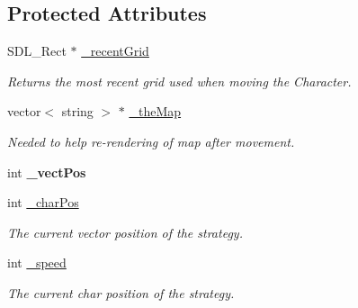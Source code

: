 \subsection*{Protected Attributes}
\begin{DoxyCompactItemize}
\item 
\hypertarget{class_movement_strategy_a767d3dbe2d33d562997a5956bd016055}{}\label{class_movement_strategy_a767d3dbe2d33d562997a5956bd016055} 
S\+D\+L\+\_\+\+Rect $\ast$ \hyperlink{class_movement_strategy_a767d3dbe2d33d562997a5956bd016055}{\+\_\+recent\+Grid}
\begin{DoxyCompactList}\small\item\em Returns the most recent grid used when moving the Character. \end{DoxyCompactList}\item 
\hypertarget{class_movement_strategy_ab89074977db87644f96ac1e53366a20c}{}\label{class_movement_strategy_ab89074977db87644f96ac1e53366a20c} 
vector$<$ string $>$ $\ast$ \hyperlink{class_movement_strategy_ab89074977db87644f96ac1e53366a20c}{\+\_\+the\+Map}
\begin{DoxyCompactList}\small\item\em Needed to help re-\/rendering of map after movement. \end{DoxyCompactList}\item 
\hypertarget{class_movement_strategy_a5e112b755ce2bcd65bcd64835bea9210}{}\label{class_movement_strategy_a5e112b755ce2bcd65bcd64835bea9210} 
int {\bfseries \+\_\+vect\+Pos}
\item 
\hypertarget{class_movement_strategy_a605a91155538e3dd161f5941851d3760}{}\label{class_movement_strategy_a605a91155538e3dd161f5941851d3760} 
int \hyperlink{class_movement_strategy_a605a91155538e3dd161f5941851d3760}{\+\_\+char\+Pos}
\begin{DoxyCompactList}\small\item\em The current vector position of the strategy. \end{DoxyCompactList}\item 
\hypertarget{class_movement_strategy_a0a3aa632db302ce1d6a407d0404f1159}{}\label{class_movement_strategy_a0a3aa632db302ce1d6a407d0404f1159} 
int \hyperlink{class_movement_strategy_a0a3aa632db302ce1d6a407d0404f1159}{\+\_\+speed}
\begin{DoxyCompactList}\small\item\em The current char position of the strategy. \end{DoxyCompactList}\end{DoxyCompactItemize}


